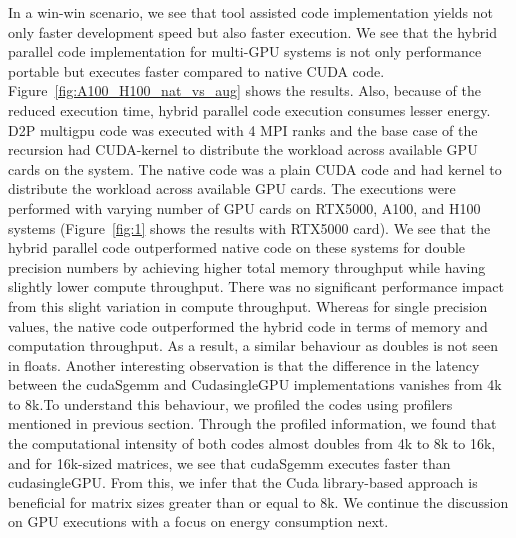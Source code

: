 In a win-win scenario, we see that tool assisted code implementation yields not only faster development speed but also faster execution. We see that the hybrid parallel code implementation for multi-GPU systems is not only performance portable but executes faster compared to native CUDA code.  Figure~\ref{fig:A100_H100_nat_vs_aug} shows the results.  Also, because of the reduced execution time, hybrid parallel code execution consumes lesser energy. D2P multigpu code was executed with 4 MPI ranks and the base case of the recursion had CUDA-kernel to distribute the workload across available GPU cards on the system. The native code was a plain CUDA code and had kernel to distribute the workload across available GPU cards. The executions were performed with varying number of GPU cards on RTX5000, A100, and H100 systems (Figure~\ref{fig:1} shows the results with RTX5000 card). We see that the hybrid parallel code outperformed native code on these systems for double precision numbers by achieving higher total memory throughput while having slightly lower compute throughput. There was no significant performance impact from this slight variation in compute throughput. Whereas for single  precision values, the native code outperformed the hybrid code in terms of memory and computation throughput. As a result, a similar behaviour as doubles is not seen in floats. Another interesting observation is that the difference in the latency between the cudaSgemm and CudasingleGPU implementations vanishes from 4k to 8k.To understand this behaviour, we profiled the codes using profilers mentioned in previous section. Through the profiled information, we found that the computational intensity of both codes almost doubles from 4k to 8k to 16k, and for 16k-sized matrices, we see that cudaSgemm executes faster than cudasingleGPU. From this, we infer that the Cuda library-based approach is beneficial for matrix sizes greater than or equal to 8k. We continue the discussion on GPU executions with a focus on energy consumption next.

